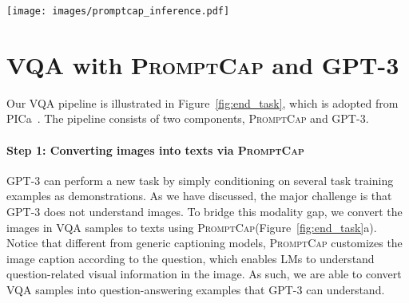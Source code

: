 \documentclass[10pt,twocolumn,letterpaper]{article}
\newcommand{\NAME}{\textsc{PromptCap}\xspace}
\begin{document}
 
\begin{figure*}[h]
\centering
  \texttt{[image: images/promptcap\_inference.pdf]}
  \caption{
Our inference pipeline for VQA. \textbf{(a) Illustration of how we convert a VQA sample into pure text.} Given the image and the question, \NAME describes the question-related visual information in natural language. The VQA sample is turned into a QA sample that GPT-3 can understand. \textbf{(b) GPT-3 in-context learning for VQA.} After converting the VQA examples into text with \NAME, we carry out VQA by in-context learning on GPT-3. The input consists of the task instruction (not shown in the figure), the in-context examples, and the test instance. GPT-3 takes the input and generates the answer. Notice that the GPT-3 is treated as a black box and is only used for inference. The question-aware captions \NAME generated are marked \textcolor{red}{red}.}
  \vspace{-4mm}
  \label{fig:end_task}
\end{figure*}


\section{VQA with \NAME and GPT-3}
\label{sec:icl}





Our VQA pipeline is illustrated in Figure~\ref{fig:end_task}, which is adopted from PICa~\cite{yang2022empirical}.
The pipeline consists of two components, \NAME and GPT-3. 

\vspace{-0.1in}
\paragraph{Step 1: Converting images into texts via \NAME}
GPT-3 can perform a new task by simply conditioning on several task training examples as demonstrations. As we have discussed, the major challenge is that GPT-3 does not understand images. To bridge this modality gap, we convert the images in VQA samples to texts using \NAME (Figure~\ref{fig:end_task}a). Notice that different from generic captioning models, \NAME customizes the image caption according to the question, which enables LMs to understand question-related visual information in the image.
As such, we are able to convert VQA samples into question-answering examples that GPT-3 can understand.

\vspace{-0.1in}
\end{document}
